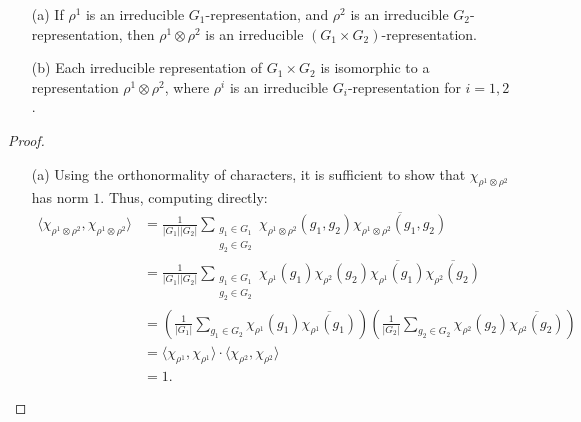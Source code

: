 \documentclass[a4paper]{report}
\theoremstyle{definition}
\theoremstyle{remark}
\theoremstyle{proposition}
\theoremstyle{conjecture}
\theoremstyle{lemma}
\theoremstyle{corollary}
\theoremstyle{exercise}
\theoremstyle{example}
\begin{document}
\begin{theorem}\label{thm_prod_groups}
    \leavevmode
    \begin{itemize}
        \item[(a)] If $\rho^1$ is an irreducible $G_1$-representation,
            and $\rho^2$ is an irreducible $G_2$-representation, then 
            $\rho^1\otimes \rho^2$ is an irreducible 
            $(G_1\times G_2)$-representation.
        \item[(b)] Each irreducible representation of $G_1\times G_2$ 
            is isomorphic to a representation $\rho^1\otimes \rho^2$,
            where $\rho^i$ is an irreducible $G_i$-representation 
            for $i=1,2$.
    \end{itemize}
\end{theorem}

\begin{proof}
    \leavevmode
    \begin{itemize}
        \item[(a)] Using the orthonormality of characters, it is sufficient
            to show that $\chi_{\rho^1\otimes\rho^2}$ has norm $1$.
            Thus, computing directly:
            \begin{align*}
                \langle \chi_{\rho^1\otimes\rho^2},\chi_{\rho^1\otimes\rho^2} \rangle&= \frac{1}{\vert G_1\vert \vert G_2\vert}\sum_{\substack{g_1\in G_1\\ g_2 \in G_2}} \chi_{\rho^1\otimes\rho^2}(g_1,g_2) \overline{\chi_{\rho^1\otimes\rho^2}(g_1,g_2)}\\
                                                                                     &= \frac{1}{\vert G_1\vert \vert G_2\vert} \sum_{\substack{g_1 \in G_1\\ g_2 \in G_2}} \chi_{\rho^1}(g_1) \chi_{\rho^2}(g_2) \overline{\chi_{\rho^1}(g_1)}\overline{\chi_{\rho^2}(g_2)}\\
                                                                              &= \left(\frac{1}{\vert G_1\vert}\sum_{g_1 \in G_2}\chi_{\rho^1}(g_1)\overline{\chi_{\rho^1}(g_1)}\right) \left(\frac{1}{\vert G_2\vert} \sum_{g_2 \in G_2} \chi_{\rho^2}(g_2)\overline{\chi_{\rho^2}(g_2)}\right)\\
                                                                              &=\langle \chi_{\rho^1},\chi_{\rho^1}\rangle \cdot \langle\chi_{\rho^2},\chi_{\rho^2}\rangle\\
                                                                              &=1.
            \end{align*}

\end{itemize}
\end{proof}
\end{document}

